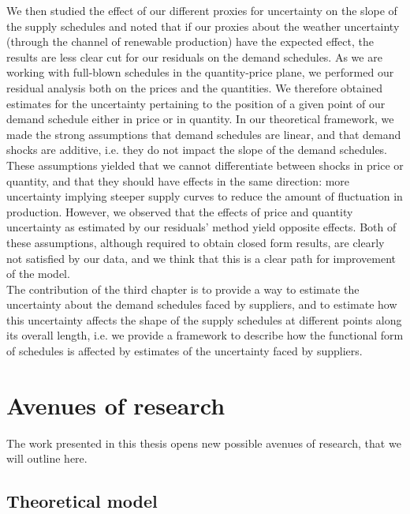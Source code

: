 We then studied the effect of our different proxies for uncertainty on the slope of the supply schedules and noted that if our proxies about the weather uncertainty (through the channel of renewable production) have the expected effect, the results are less clear cut for our residuals on the demand schedules. As we are working with full-blown schedules in the quantity-price plane, we performed our residual analysis both on the prices and the quantities. We therefore obtained estimates for the uncertainty pertaining to the position of a given point of our demand schedule either in price or in quantity. In our theoretical framework, we made the strong assumptions that demand schedules are linear, and that demand shocks are additive, i.e. they do not impact the slope of the demand schedules. These assumptions yielded that we cannot differentiate between shocks in price or quantity, and that they should have effects in the same direction: more uncertainty implying steeper supply curves to reduce the amount of fluctuation in production. However, we observed that the effects of price and quantity uncertainty as estimated by our residuals' method yield opposite effects. Both of these assumptions, although required to obtain closed form results, are clearly not satisfied by our data, and we think that this is a clear path for improvement of the model.  \\

The contribution of the third chapter is to provide a way to estimate the uncertainty about the demand schedules faced by suppliers, and to estimate how this uncertainty affects the shape of the supply schedules at different points along its overall length, i.e. we provide a framework to describe how the functional form of schedules is affected by estimates of the uncertainty faced by suppliers.\\

\section*{Avenues of research}

The work presented in this thesis opens new possible avenues of research, that we will outline here. 

\subsection*{Theoretical model}

